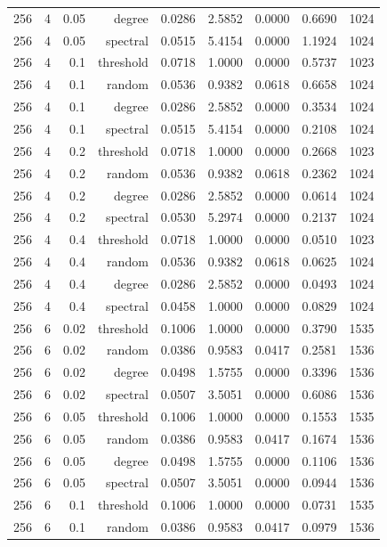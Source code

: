 \begin{table}[t]
\begin{tabular}{lrrrrrrrr}
256 & 4 & 0.05 & degree & 0.0286 & 2.5852 & 0.0000 & 0.6690 & 1024 \\
256 & 4 & 0.05 & spectral & 0.0515 & 5.4154 & 0.0000 & 1.1924 & 1024 \\
256 & 4 & 0.1 & threshold & 0.0718 & 1.0000 & 0.0000 & 0.5737 & 1023 \\
256 & 4 & 0.1 & random & 0.0536 & 0.9382 & 0.0618 & 0.6658 & 1024 \\
256 & 4 & 0.1 & degree & 0.0286 & 2.5852 & 0.0000 & 0.3534 & 1024 \\
256 & 4 & 0.1 & spectral & 0.0515 & 5.4154 & 0.0000 & 0.2108 & 1024 \\
256 & 4 & 0.2 & threshold & 0.0718 & 1.0000 & 0.0000 & 0.2668 & 1023 \\
256 & 4 & 0.2 & random & 0.0536 & 0.9382 & 0.0618 & 0.2362 & 1024 \\
256 & 4 & 0.2 & degree & 0.0286 & 2.5852 & 0.0000 & 0.0614 & 1024 \\
256 & 4 & 0.2 & spectral & 0.0530 & 5.2974 & 0.0000 & 0.2137 & 1024 \\
256 & 4 & 0.4 & threshold & 0.0718 & 1.0000 & 0.0000 & 0.0510 & 1023 \\
256 & 4 & 0.4 & random & 0.0536 & 0.9382 & 0.0618 & 0.0625 & 1024 \\
256 & 4 & 0.4 & degree & 0.0286 & 2.5852 & 0.0000 & 0.0493 & 1024 \\
256 & 4 & 0.4 & spectral & 0.0458 & 1.0000 & 0.0000 & 0.0829 & 1024 \\
256 & 6 & 0.02 & threshold & 0.1006 & 1.0000 & 0.0000 & 0.3790 & 1535 \\
256 & 6 & 0.02 & random & 0.0386 & 0.9583 & 0.0417 & 0.2581 & 1536 \\
256 & 6 & 0.02 & degree & 0.0498 & 1.5755 & 0.0000 & 0.3396 & 1536 \\
256 & 6 & 0.02 & spectral & 0.0507 & 3.5051 & 0.0000 & 0.6086 & 1536 \\
256 & 6 & 0.05 & threshold & 0.1006 & 1.0000 & 0.0000 & 0.1553 & 1535 \\
256 & 6 & 0.05 & random & 0.0386 & 0.9583 & 0.0417 & 0.1674 & 1536 \\
256 & 6 & 0.05 & degree & 0.0498 & 1.5755 & 0.0000 & 0.1106 & 1536 \\
256 & 6 & 0.05 & spectral & 0.0507 & 3.5051 & 0.0000 & 0.0944 & 1536 \\
256 & 6 & 0.1 & threshold & 0.1006 & 1.0000 & 0.0000 & 0.0731 & 1535 \\
256 & 6 & 0.1 & random & 0.0386 & 0.9583 & 0.0417 & 0.0979 & 1536 \\

\end{tabular}
\end{table}

